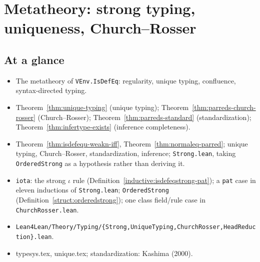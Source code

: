 \chapter{Metatheory: strong typing, uniqueness, Church--Rosser}
\label{chap:metatheory}

\section*{At a glance}
\begin{itemize}
\item {} The metatheory of \texttt{VEnv.IsDefEq}: regularity, unique typing,
      confluence, syntax-directed typing.
\item {} Theorem~\ref{thm:unique-typing} (unique typing);
      Theorem~\ref{thm:parreds-church-rosser} (Church--Rosser); Theorem~\ref{thm:parreds-standard}
      (standardization); Theorem~\ref{thm:infertype-exists} (inference completeness).
\item {} \stSorry{} Theorem~\ref{thm:isdefequ-weakn-iff},
      Theorem~\ref{thm:normaleq-parred}; \stTainted{} unique typing, Church--Rosser,
      standardization, inference; \stProved{} \texttt{Strong.lean}, taking
      \texttt{OrderedStrong} as a hypothesis rather than deriving it.
\item {} \texttt{iota}: the strong $\iota$ rule
      (Definition~\ref{inductive:isdefeqstrong-pat}); a \texttt{pat} case in eleven inductions
      of \texttt{Strong.lean}; \texttt{OrderedStrong}
      (Definition~\ref{struct:orderedstrong}); one class field/rule case in
      \texttt{ChurchRosser.lean}.
\item {} \texttt{Lean4Lean/Theory/Typing/\{Strong,UniqueTyping,ChurchRosser,HeadReduction\}.lean}.
\item {} typesys.tex, unique.tex; standardization: Kashima (2000).
\end{itemize}

